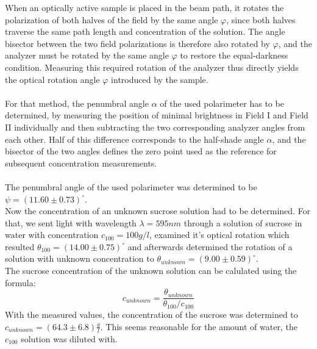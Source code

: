 When an optically active sample is placed in the
beam path, it rotates the polarization of both halves of the field by
the same angle $\varphi$, since both halves traverse the same path length
and concentration of the solution. The angle bisector between the two field
polarizations is therefore also rotated by $\varphi$, and the analyzer must
be rotated by the same angle $\varphi$ to restore the equal-darkness
condition. Measuring this required rotation of the analyzer thus directly
yields the optical rotation angle $\varphi$ introduced by the sample.
\\
\\
For that method, the penumbral angle $\alpha$ of the used polarimeter has to
be determined, by measuring the position of minimal brightness in Field I
and Field II individually and then
subtracting the two corresponding analyzer angles from each other. Half of this difference corresponds to the
half-shade angle $\alpha$, and the bisector of the two angles defines the
zero point used as the reference for subsequent
concentration measurements. \\
\\
    The penumbral angle of the used polarimeter was determined to be $\psi = (11.60 \pm 0.73)^\circ$. \\
    Now the concentration of an unknown sucrose solution had to be determined. For that, we sent light with wavelength $\lambda = 595 nm$ through a solution
    of sucrose in water with concentration $c_{100} = 100 g/l$, examined it's optical rotation which resulted $\theta_{100} = (14.00 \pm 0.75)^\circ$ and afterwards 
    determined the rotation of a solution with unknown concentration to $\theta_{unknown} = (9.00 \pm 0.59)^\circ$.\\
    The sucrose concentration of the unknown solution can be calulated using the formula:
    \begin{equation}
        c_{unknown} = \frac{\theta_{unknown}}{\theta_{100}/c_{100}}
    \end{equation}
    With the measured values, the concentration of the sucrose was determined to $c_{unknown} = (64.3 \pm 6.8) \frac{g}{l}$. This seems reasonable for the amount
    of water, the $c_{100}$ solution was diluted with.
    

